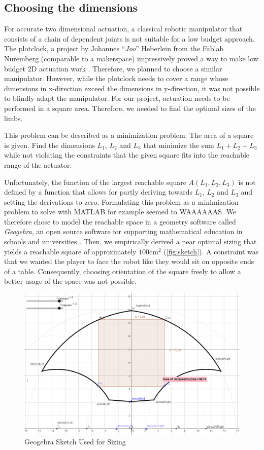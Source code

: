 \documentclass{sig-alternate-05-2015}
\begin{document}
\subsection{Choosing the dimensions}
For accurate two dimensional actuation, a classical robotic manipulator that  consists of a chain of dependent joints is not suitable for a low budget approach. The plotclock, a project by Johannes ``\emph{Joo}'' Heberlein from the Fablab Nuremberg (comparable to a makerspace) impressively proved a way to make low budget 2D actuation work \cite{Joo}. Therefore, we planned to choose a similar manipulator. However, while the plotclock needs to cover a range whose dimensions in x-direction exceed the dimensions in y-direction, it was not possible to blindly adapt the manipulator. For our project, actuation needs to be performed in a square area. Therefore, we needed to find the optimal sizes of the limbs.

This problem can be described as a minimization problem: The area of a square is given. Find the dimensions $L_1$, $L_2$ and $L_3$ that minimize the sum $L_1 + L_2 +L_3$ while not violating the constraints that the given square fits into the reachable range of the actuator.
 
Unfortunately, the function of the largest reachable square $A(L_1, L_2, L_3)$ is not defined by a function that allows for partly deriving towards $L_1$, $L_2$ and $L_3$ and setting the derivations to zero. Formulating this problem as a minimization problem to solve with MATLAB for example seemed to WAAAAAAS. We therefore chose to model the reachable space in a geometry software called \emph{Geogebra}, an open source software for supporting mathematical education in schools and universities \cite{Geo}. Then, we empirically derived a near optimal sizing that yields a reachable square of approximately $100 \mathrm{cm}^2$ (\autoref{fig:sketch}). A constraint was that we wanted the player to face the robot like they would sit on opposite ends of a table. Consequently, choosing orientation of the square freely to allow a better usage of the space was not possible.
\begin{figure}
 	\centering
 	\includegraphics[width=.42\textwidth]{img/sizing.png}
    \caption{Geogebra Sketch Used for Sizing}
\end{figure}
\end{document}
